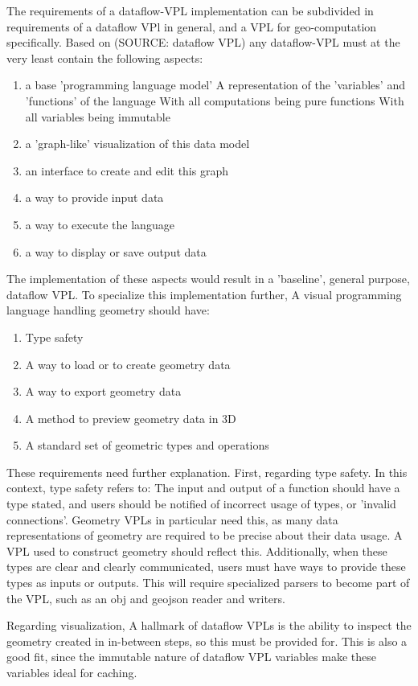 The requirements of a dataflow-VPL implementation can be subdivided in requirements of a dataflow VPl in general, and a VPL for geo-computation specifically.
Based on (SOURCE: dataflow VPL) any dataflow-VPL must at the very least contain the following aspects: 
\begin{enumerate}[-]
  \item a base 'programming language model'
  \subitem A representation of the 'variables' and 'functions' of the language
  \subitem With all computations being pure functions
  \subitem With all variables being immutable
  \item a 'graph-like' visualization of this data model
  \item an interface to create and edit this graph 
  \item a way to provide input data 
  \item a way to execute the language
  \item a way to display or save output data
\end{enumerate}
The implementation of these aspects would result in a 'baseline', general purpose, dataflow VPL. 
To specialize this implementation further, A visual programming language handling geometry should have:
\begin{enumerate}[-]
  \item Type safety 
  \item A way to load or to create geometry data 
  \item A way to export geometry data
  \item A method to preview geometry data in 3D
  \item A standard set of geometric types and operations
\end{enumerate}
These requirements need further explanation.
First, regarding type safety.
In this context, type safety refers to: 
The input and output of a function should have a type stated, and users should be notified of incorrect usage of types, or 'invalid connections'.
Geometry VPLs in particular need this, as many data representations of geometry are required to be precise about their data usage.
A VPL used to construct geometry should reflect this.
Additionally, when these types are clear and clearly communicated, users must have ways to provide these types as inputs or outputs. 
This will require specialized parsers to become part of the VPL, such as an obj and geojson reader and writers. 

Regarding visualization, A hallmark of dataflow VPLs is the ability to inspect the geometry created in in-between steps, so this must be provided for.
This is also a good fit, since the immutable nature of dataflow VPL variables make these variables ideal for caching. 

